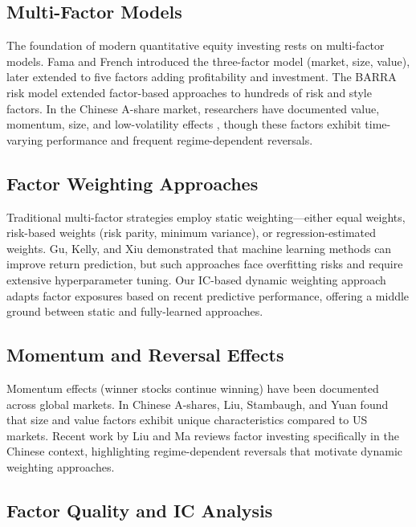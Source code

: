 \documentclass[12pt]{article}
\begin{document}
\subsection{Multi-Factor Models}

The foundation of modern quantitative equity investing rests on multi-factor models. Fama and French \citep{fama1993} introduced the three-factor model (market, size, value), later extended to five factors \citep{fama2015} adding profitability and investment. The BARRA risk model \citep{rosenberg1974, msci2023} extended factor-based approaches to hundreds of risk and style factors. In the Chinese A-share market, researchers have documented value, momentum, size, and low-volatility effects \citep{liu2019, liu2022}, though these factors exhibit time-varying performance and frequent regime-dependent reversals.

\subsection{Factor Weighting Approaches}

Traditional multi-factor strategies employ static weighting---either equal weights, risk-based weights (risk parity, minimum variance), or regression-estimated weights. Gu, Kelly, and Xiu \citep{gu2020} demonstrated that machine learning methods can improve return prediction, but such approaches face overfitting risks and require extensive hyperparameter tuning. Our IC-based dynamic weighting approach adapts factor exposures based on recent predictive performance, offering a middle ground between static and fully-learned approaches.

\subsection{Momentum and Reversal Effects}

Momentum effects (winner stocks continue winning) have been documented across global markets. In Chinese A-shares, Liu, Stambaugh, and Yuan \citep{liu2019} found that size and value factors exhibit unique characteristics compared to US markets. Recent work by Liu and Ma \citep{liu2022} reviews factor investing specifically in the Chinese context, highlighting regime-dependent reversals that motivate dynamic weighting approaches.

\subsection{Factor Quality and IC Analysis}
\end{document}
